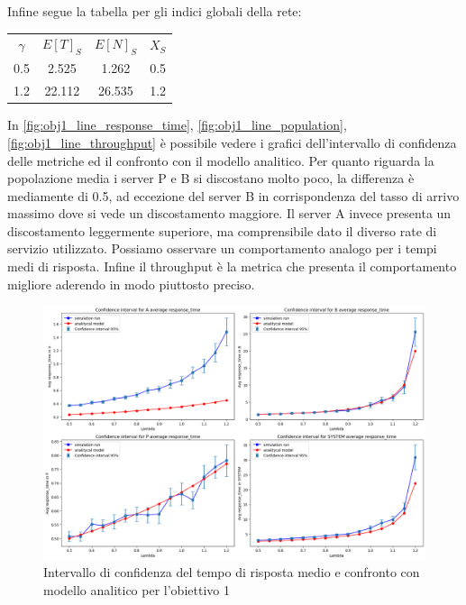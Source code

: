 Infine segue la tabella per gli indici globali della rete:\\
\begin{table}[H]
    \centering
    \begin{tabular}{cccc}
        $\gamma$ & $E[T]_{S}$ & $E[N]_{S}$ & $X_{S}$ \\         
        0.5 & 2.525 & 1.262 & 0.5 \\
        1.2 & 22.112 & 26.535 & 1.2 \\
    \end{tabular}
    \label{tab:et_en_x_values_last_first}
\end{table}
In \autoref{fig:obj1_line_response_time}, \autoref{fig:obj1_line_population}, \autoref{fig:obj1_line_throughput} è possibile vedere i grafici dell'intervallo di confidenza delle metriche ed il confronto con il modello analitico. Per quanto riguarda la popolazione media i server P e B si discostano molto poco, la differenza è mediamente di 0.5, ad eccezione del server B in corrispondenza del tasso di arrivo massimo dove si vede un discostamento maggiore. Il server A invece presenta un discostamento leggermente superiore, ma comprensibile dato il diverso rate di servizio utilizzato. Possiamo osservare un comportamento analogo per i tempi medi di risposta. Infine il throughput è la metrica che presenta il comportamento migliore aderendo in modo piuttosto preciso.
\begin{figure}
    \centering
    \includegraphics[width=\textwidth]{figs//results/obj1/obj1-line-response-time.png}
    \caption{Intervallo di confidenza del tempo di risposta medio e confronto con modello analitico per l'obiettivo 1}
    \label{fig:obj1_line_response_time}
\end{figure}
